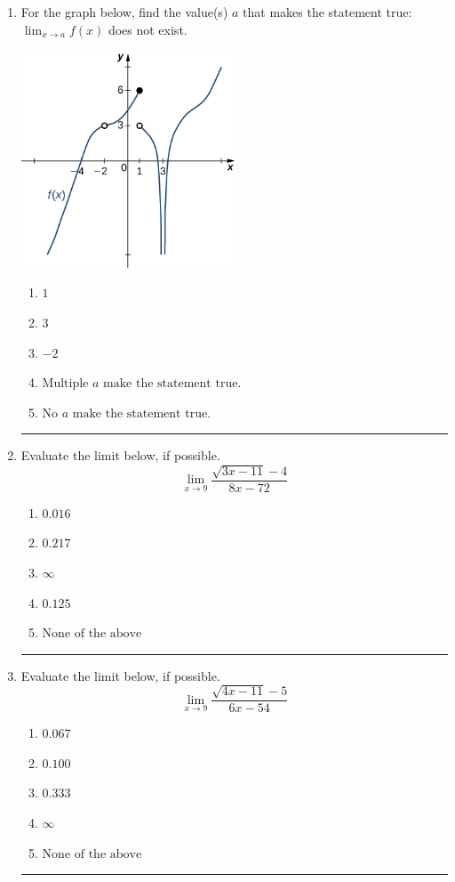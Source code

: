 \documentclass[14pt]{extbook}
\newcommand{\litem}[1]{\item#1\hspace*{-1cm}\rule{\textwidth}{0.4pt}}
\begin{document}
\begin{enumerate}
{\begin{enumerate}[label=\Alph*.]
\end{enumerate} }
\litem{
For the graph below, find the value(s) $a$ that makes the statement true: $ \displaystyle \lim_{x \rightarrow a} f(x)$ does not exist.
\begin{center}
    \includegraphics[width=0.5\textwidth]{../Figures/evaluateLimitGraphicallyCopyA.png}
\end{center}
\begin{enumerate}[label=\Alph*.]
\item \( 1 \)
\item \( 3 \)
\item \( -2 \)
\item \( \text{Multiple } a \text{ make the statement true}. \)
\item \( \text{No } a \text{ make the statement true}. \)

\end{enumerate} }
\litem{
Evaluate the limit below, if possible.\[ \lim_{x \rightarrow 9} \frac{\sqrt{3x - 11} - 4}{8x - 72} \]\begin{enumerate}[label=\Alph*.]
\item \( 0.016 \)
\item \( 0.217 \)
\item \( \infty \)
\item \( 0.125 \)
\item \( \text{None of the above} \)

\end{enumerate} }
\litem{
Evaluate the limit below, if possible.\[ \lim_{x \rightarrow 9} \frac{\sqrt{4x - 11} - 5}{6x - 54} \]\begin{enumerate}[label=\Alph*.]
\item \( 0.067 \)
\item \( 0.100 \)
\item \( 0.333 \)
\item \( \infty \)
\item \( \text{None of the above} \)


\end{enumerate}}
\end{enumerate}
\end{document}
